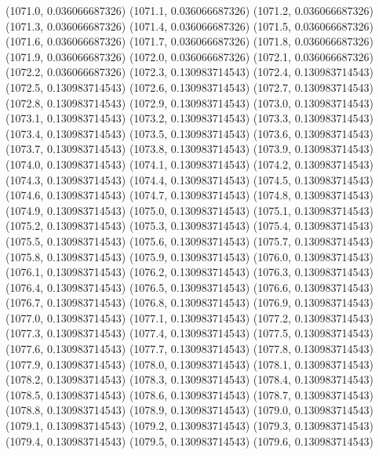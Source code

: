 {					(1071.0, 0.036066687326)
					(1071.1, 0.036066687326)
					(1071.2, 0.036066687326)
					(1071.3, 0.036066687326)
					(1071.4, 0.036066687326)
					(1071.5, 0.036066687326)
					(1071.6, 0.036066687326)
					(1071.7, 0.036066687326)
					(1071.8, 0.036066687326)
					(1071.9, 0.036066687326)
					(1072.0, 0.036066687326)
					(1072.1, 0.036066687326)
					(1072.2, 0.036066687326)
					(1072.3, 0.130983714543)
					(1072.4, 0.130983714543)
					(1072.5, 0.130983714543)
					(1072.6, 0.130983714543)
					(1072.7, 0.130983714543)
					(1072.8, 0.130983714543)
					(1072.9, 0.130983714543)
					(1073.0, 0.130983714543)
					(1073.1, 0.130983714543)
					(1073.2, 0.130983714543)
					(1073.3, 0.130983714543)
					(1073.4, 0.130983714543)
					(1073.5, 0.130983714543)
					(1073.6, 0.130983714543)
					(1073.7, 0.130983714543)
					(1073.8, 0.130983714543)
					(1073.9, 0.130983714543)
					(1074.0, 0.130983714543)
					(1074.1, 0.130983714543)
					(1074.2, 0.130983714543)
					(1074.3, 0.130983714543)
					(1074.4, 0.130983714543)
					(1074.5, 0.130983714543)
					(1074.6, 0.130983714543)
					(1074.7, 0.130983714543)
					(1074.8, 0.130983714543)
					(1074.9, 0.130983714543)
					(1075.0, 0.130983714543)
					(1075.1, 0.130983714543)
					(1075.2, 0.130983714543)
					(1075.3, 0.130983714543)
					(1075.4, 0.130983714543)
					(1075.5, 0.130983714543)
					(1075.6, 0.130983714543)
					(1075.7, 0.130983714543)
					(1075.8, 0.130983714543)
					(1075.9, 0.130983714543)
					(1076.0, 0.130983714543)
					(1076.1, 0.130983714543)
					(1076.2, 0.130983714543)
					(1076.3, 0.130983714543)
					(1076.4, 0.130983714543)
					(1076.5, 0.130983714543)
					(1076.6, 0.130983714543)
					(1076.7, 0.130983714543)
					(1076.8, 0.130983714543)
					(1076.9, 0.130983714543)
					(1077.0, 0.130983714543)
					(1077.1, 0.130983714543)
					(1077.2, 0.130983714543)
					(1077.3, 0.130983714543)
					(1077.4, 0.130983714543)
					(1077.5, 0.130983714543)
					(1077.6, 0.130983714543)
					(1077.7, 0.130983714543)
					(1077.8, 0.130983714543)
					(1077.9, 0.130983714543)
					(1078.0, 0.130983714543)
					(1078.1, 0.130983714543)
					(1078.2, 0.130983714543)
					(1078.3, 0.130983714543)
					(1078.4, 0.130983714543)
					(1078.5, 0.130983714543)
					(1078.6, 0.130983714543)
					(1078.7, 0.130983714543)
					(1078.8, 0.130983714543)
					(1078.9, 0.130983714543)
					(1079.0, 0.130983714543)
					(1079.1, 0.130983714543)
					(1079.2, 0.130983714543)
					(1079.3, 0.130983714543)
					(1079.4, 0.130983714543)
					(1079.5, 0.130983714543)
					(1079.6, 0.130983714543)
}
